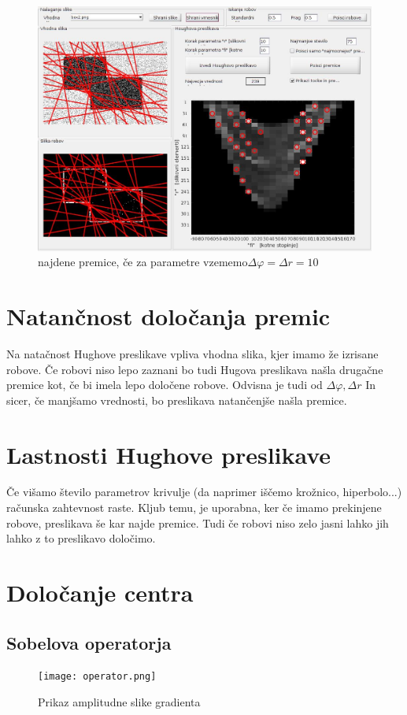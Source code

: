\documentclass[12pt,a4paper]{article}
\begin{document}
\begin{figure}[h!]
  \begin{center}
    \includegraphics[scale = 0.3]{r10.jpg}
    \caption{najdene premice, če za parametre vzememo$\Delta \varphi = \Delta r = 10$}
    \label{fig:}
  \end{center}
\end{figure}
\pagebreak
\section{Natančnost določanja premic}
Na natačnost Hughove preslikave vpliva vhodna slika, kjer imamo že izrisane robove. Če robovi niso lepo zaznani bo tudi Hugova preslikava našla drugačne premice kot, če bi imela lepo določene robove.
Odvisna je tudi od  $\Delta \varphi, \Delta r$ In sicer, če manjšamo vrednosti, bo preslikava natančenjše našla premice. 
\section{Lastnosti Hughove preslikave}
 Če višamo število parametrov krivulje (da naprimer iščemo krožnico, hiperbolo...) računska zahtevnost raste. Kljub temu, je uporabna, ker če imamo prekinjene robove, preslikava še kar najde premice. Tudi če robovi niso zelo jasni lahko jih lahko z to preslikavo določimo.
 \section{Določanje centra}
 \subsection{Sobelova operatorja}
\begin{figure}[h!]
  \begin{center}
    \texttt{[image: operator.png]}
    \caption{Prikaz amplitudne slike gradienta}
    \label{fig:}
  \end{center}
\end{figure}
\pagebreak
\end{document}
